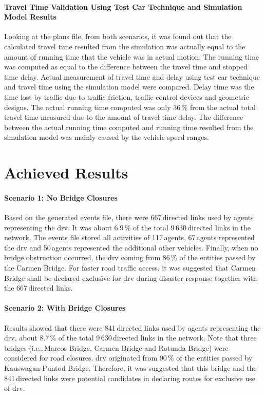 \paragraph{Travel Time Validation Using Test Car Technique and Simulation Model Results}
Looking at the plans file, from both scenarios, it was found out that the calculated travel time resulted from the simulation was actually equal to the amount of running time that the vehicle was in actual motion. The running time was computed as equal to the difference between the travel time and stopped time delay. Actual measurement of travel time and delay using test car technique \citep[][]{Sigua_2008} and travel time using the simulation model were compared. Delay time was the time lost by traffic due to traffic friction, traffic control devices and geometric designs. The actual running time computed was only 36\,\% from the actual total travel time measured due to the amount of travel time delay. The difference between the actual running time computed and running time resulted from the simulation model was mainly caused by the vehicle speed ranges. 

\section{Achieved Results}
\paragraph{Scenario 1: No Bridge Closures}
Based on the generated events file, there were 667\,directed links used by agents representing the \gls{drv}. It was about 6.9\,\% of the total 9\,630\,directed links in the network. The events file stored all activities of 117\,agents, 67\,agents represented the \gls{drv} and 50\,agents represented the additional other vehicles. Finally, when no bridge obstruction occurred, the \gls{drv} coming from 86\,\% of the entities passed by the Carmen Bridge. For faster road traffic access, it was suggested that Carmen Bridge shall be declared exclusive for \gls{drv} during disaster response together with the 667\,directed links.

\paragraph{Scenario 2: With Bridge Closures}
Results showed that there were 841\,directed links used by agents representing the \gls{drv}, about 8.7\,\% of the total 9\,630\,directed links in the network. Note that three bridges (i.e.,\,Marcos Bridge, Carmen Bridge and Rotunda Bridge) were considered for road closures. \gls{drv} originated from 90\,\% of the entities passed by Kauswagan-Puntod Bridge. Therefore, it was suggested that this bridge and the 841\,directed links were potential candidates in declaring routes for exclusive use of \gls{drv}.

